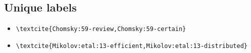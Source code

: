 \subsection{Unique labels}

\begin{itemize}
\item \verb=\textcite{Chomsky:59-review,Chomsky:59-certain}= \newline \textcite{Chomsky:59-review,Chomsky:59-certain}
\item \verb=\textcite{Mikolov:etal:13-efficient,Mikolov:etal:13-distributed}= \newline \textcite{Mikolov:etal:13-efficient,Mikolov:etal:13-distributed}
\end{itemize}



\newpage
 
\printbibliography 


